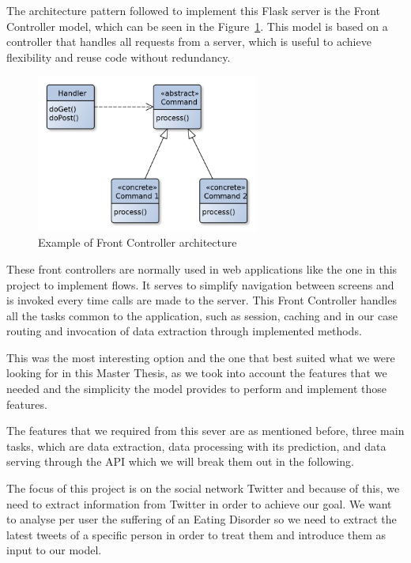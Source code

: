  
 
 The architecture pattern followed to implement this Flask server is the Front Controller model, which can be seen in the Figure~\ref{fig:front-controller}. This model is based on a controller that handles all requests from a server, which is useful to achieve flexibility and reuse code without redundancy.

 
\begin{figure}[h]
    \centering
    \includegraphics[width=0.65\textwidth]{img/architecture/Front_Controller.png}
    \caption{Example of Front Controller architecture}
    \label{fig:front-controller}
\end{figure}

These front controllers are normally used in web applications like the one in this project to implement flows. It serves to simplify navigation between screens and is invoked every time calls are made to the server. This Front Controller handles all the tasks common to the application, such as session, caching and in our case routing and invocation of data extraction through implemented methods.

This was the most interesting option and the one that best suited what we were looking for in this Master Thesis, as we took into account the features that we needed and the simplicity the model provides to perform and implement those features. 

The features that we required from this sever are as mentioned before, three main tasks, which are data extraction, data processing with its prediction, and data serving through the API which we will break them out in the following.

The focus of this project is on the social network Twitter and because of this, we need to extract information from Twitter in order to achieve our goal. We want to analyse per user the suffering of an Eating Disorder so we need to extract the latest tweets of a specific person in order to treat them and introduce them as input to our model.

